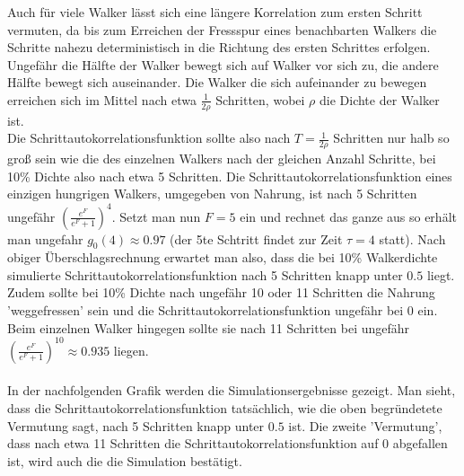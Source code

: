 \documentclass[a4paper, 12pt]{report}
\begin{document}
\noindent Auch für viele Walker lässt sich eine längere Korrelation zum ersten Schritt vermuten, da bis zum Erreichen der Fressspur eines benachbarten Walkers die Schritte nahezu deterministisch in die Richtung des ersten Schrittes erfolgen.
\\
\noindent Ungefähr die Hälfte der Walker bewegt sich auf Walker vor sich zu, die andere Hälfte bewegt sich auseinander. Die Walker die sich aufeinander zu bewegen erreichen sich im Mittel nach etwa $\frac{1}{2 \rho}$ Schritten, wobei $\rho$ die Dichte der Walker ist.
\\
\noindent Die Schrittautokorrelationsfunktion sollte also nach $T = \frac{1}{2 \rho}$ Schritten nur halb so groß sein wie die des einzelnen Walkers nach der gleichen Anzahl Schritte, bei 10\% Dichte also nach etwa 5 Schritten. Die Schrittautokorrelationsfunktion eines einzigen hungrigen Walkers, umgegeben von Nahrung, ist nach 5 Schritten ungefähr $\left(\frac{e^F}{e^F+1}\right)^{4}$. Setzt man nun $F=5$ ein und rechnet das ganze aus so erhält man ungefahr $g_0(4) \approx 0.97$ (der 5te Schtritt findet zur Zeit $\tau =4$ statt). Nach obiger Überschlagsrechnung erwartet man also, dass die bei 10\% Walkerdichte simulierte Schrittautokorrelationsfunktion nach 5 Schritten knapp unter $0.5$ liegt.
\\
\noindent Zudem sollte bei 10\% Dichte nach ungefähr 10 oder 11 Schritten die Nahrung 'weggefressen' sein und die Schrittautokorrelationsfunktion ungefähr bei 0 ein. Beim einzelnen Walker hingegen sollte sie nach 11 Schritten bei ungefähr $\left(\frac{e^F}{e^F+1}\right)^{10}\approx 0.935$ liegen.
\\
\\
\noindent In der nachfolgenden Grafik werden die Simulationsergebnisse gezeigt. Man sieht, dass die Schrittautokorrelationsfunktion tatsächlich, wie die oben begründetete Vermutung sagt, nach 5 Schritten knapp unter $0.5$ ist. Die zweite 'Vermutung', dass nach etwa 11 Schritten die Schrittautokorrelationsfunktion auf 0 abgefallen ist, wird auch die die Simulation bestätigt.
\end{document}
